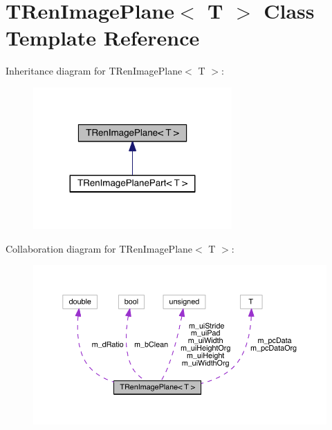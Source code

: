 \hypertarget{class_t_ren_image_plane}{}\section{T\+Ren\+Image\+Plane$<$ T $>$ Class Template Reference}
\label{class_t_ren_image_plane}


Inheritance diagram for T\+Ren\+Image\+Plane$<$ T $>$\+:
\nopagebreak
\begin{figure}[H]
\begin{center}
\leavevmode
\includegraphics[width=215pt]{d3/dd1/class_t_ren_image_plane__inherit__graph}
\end{center}
\end{figure}


Collaboration diagram for T\+Ren\+Image\+Plane$<$ T $>$\+:
\nopagebreak
\begin{figure}[H]
\begin{center}
\leavevmode
\includegraphics[width=350pt]{de/dda/class_t_ren_image_plane__coll__graph}
\end{center}
\end{figure}
